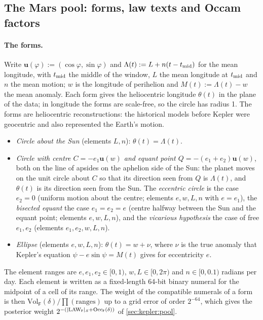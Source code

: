 \subsection{The Mars pool: forms, law texts and Occam factors}\label{sec:kepler:pooldetails}

\paragraph{The forms.} Write $\mathbf u(\varphi):=(\cos\varphi,\sin\varphi)$ and $\Lambda(t):=L+n(t-t_{\rm mid})$ for the mean longitude, with $t_{\rm mid}$ the middle of the window, $L$ the mean longitude at $t_{\rm mid}$ and $n$ the mean motion; $w$ is the longitude of perihelion and $M(t):=\Lambda(t)-w$ the mean anomaly. Each form gives the heliocentric longitude $\theta(t)$ in the plane of the data; in longitude the forms are scale-free, so the circle has radius 1. The forms are heliocentric reconstructions: the historical models before Kepler were geocentric and also represented the Earth's motion.
\begin{itemize}[leftmargin=*,itemsep=1pt]
\item \emph{Circle about the Sun} (elements $L,n$): $\theta(t)=\Lambda(t)$.
\item \emph{Circle with centre $C=-e_1\mathbf u(w)$ and equant point $Q=-(e_1+e_2)\mathbf u(w)$}, both on the line of apsides on the aphelion side of the Sun: the planet moves on the unit circle about $C$ so that its direction seen from $Q$ is $\Lambda(t)$, and $\theta(t)$ is its direction seen from the Sun. The \emph{eccentric circle} is the case $e_2=0$ (uniform motion about the centre; elements $e,w,L,n$ with $e=e_1$), the \emph{bisected equant} the case $e_1=e_2=e$ (centre halfway between the Sun and the equant point; elements $e,w,L,n$), and the \emph{vicarious hypothesis} the case of free $e_1,e_2$ (elements $e_1,e_2,w,L,n$).
\item \emph{Ellipse} (elements $e,w,L,n$): $\theta(t)=w+\nu$, where $\nu$ is the true anomaly that Kepler's equation $\psi-e\sin\psi=M(t)$ gives for eccentricity $e$.
\end{itemize}
The element ranges are $e,e_1,e_2\in[0,1)$, $w,L\in[0,2\pi)$ and $n\in[0,0.1)$ radians per day. Each element is written as a fixed-length 64-bit binary numeral for the midpoint of a cell of its range. The weight of the compatible numerals of a form is then $\mathrm{Vol}_{\mathsf F}(\delta)/\prod(\text{ranges})$ up to a grid error of order $2^{-64}$, which gives the posterior weight $2^{-(\lvert\mathrm{LAW}_{\mathsf F}\rvert_S+\mathrm{Occ}_{\mathsf F}(\delta))}$ of \cref{sec:kepler:pool}.

